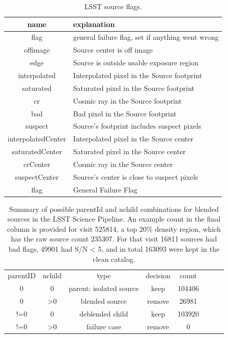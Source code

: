 \documentclass[DM,lsstdraft,toc,usenatbib,authoryear]{lsstdoc}
\begin{document}
\begin{table}
\centering
\caption{LSST source flags.}
\label{tab:lsst_flags}
\begin{tabular}{cl}
\hline
name & explanation \\
\hline
flag & general failure flag, set if anything went wrong \\
offimage & Source center is off image \\
edge & Source is outside usable exposure region  \\
interpolated & Interpolated pixel in the Source footprint \\
saturated & Saturated pixel in the Source footprint \\
cr & Cosmic ray in the Source footprint \\
bad & Bad pixel in the Source footprint \\
suspect & Source's footprint includes suspect pixels \\
interpolatedCenter & Interpolated pixel in the Source center \\
saturatedCenter & Saturated pixel in the Source center \\
crCenter & Cosmic ray in the Source center \\
suspectCenter & Source's center is close to suspect pixels \\
flag & General Failure Flag \\
\hline
\end{tabular}
\end{table}


\begin{table}
\centering
\caption{Summary of possible parentId and nchild combinations for blended sources in the LSST Science Pipeline. An example count in the final column is provided for visit 525814, a top 20\% density region, which has the raw source count 235307. For that visit  16811 sources had bad flags, 49901  had S/N < 5, and in total 163093 were kept in the clean catalog.  }
\label{tab:lsst_deblend}
\begin{tabular}{cccccccc}
parentID & nchild & type  & decision &  count \\
0 & 0 & parent: isolated source & keep & 104406 \\
0 & >0 & blended source & remove & 26981 \\
!=0 & 0 & deblended child & keep  &103920\\
!=0 & >0 & failure case & remove & 0 \\
\hline
\end{tabular}
\end{table}
\end{document}
